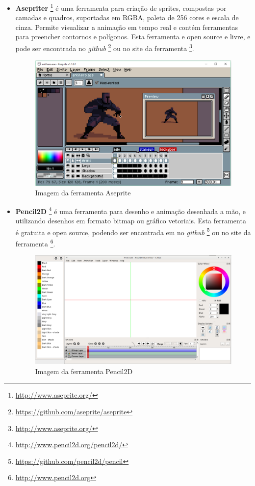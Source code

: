 \begin{itemize}
    \item \textbf{Asepriter}
\footnote{\url{http://www.aseprite.org/}} é uma ferramenta para criação de sprites,
 compostas por camadas e quadros, suportadas em RGBA, paleta de 256 cores e escala de cinza.
 Permite visualizar a animação em tempo real e contém ferramentas para preencher contornos
 e polígonos. Esta ferramenta e open source e livre, e pode ser encontrada no \textit{github}
\footnote{\url{https://github.com/aseprite/aseprite}} ou no site da ferramenta
\footnote{\url{http://www.aseprite.org/}}.

    \begin{figure}[h]
        \centering
            \includegraphics[scale=0.3]{figuras/aseprite.eps}
        \caption{Imagem da ferramenta Aseprite}
        \label{ferramenta_aseprite}
    \end{figure}

    \item \textbf{Pencil2D}
\footnote{\url{http://www.pencil2d.org/pencil2d/}} é uma ferramenta para
 desenho e animação desenhada a mão, e utilizando desenhos em formato bitmap ou gráfico vetoriais. 
Esta ferramenta é gratuita  e open source, podendo ser encontrada em no \textit{github}
\footnote{\url{https://github.com/pencil2d/pencil}} ou no site da ferramenta
\footnote{\url{http://www.pencil2d.org}}.

    \begin{figure}[h]
        \centering
            \includegraphics[scale=0.3]{figuras/pencil2D.eps}
        \caption{Imagem da ferramenta Pencil2D}
        \label{ferramenta_pencil2D}
    \end{figure}


\end{itemize}
